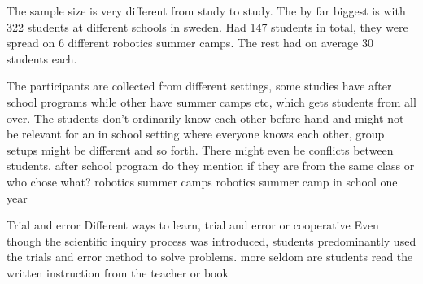 \bigskip\noindent
The sample size is very different from study to study. The by far biggest is \cite{lindh2007does} with 322 students at different schools in sweden. \cite{nugent2009use} Had 147 students in total, they were spread on 6 different robotics summer camps. The rest had on average 30 students each.

\bigskip\noindent
The participants are collected from different settings, some studies have after school programs while other have summer camps etc, which gets students from all over. The students don’t ordinarily know each other before hand and might not be relevant for an in school setting where everyone knows each other, group setups might be different and so forth. There might even be conflicts between students.
\cite{barker2007robotics} after school program do they mention if they are from the same class or who chose what?
\cite{nugent2009use} robotics summer camps
\cite{williams2007acquisition} robotics summer camp
\cite{lindh2007does} in school one year

\bigskip\noindent
Trial and error 
\cite{lindh2007does} Different ways to learn, trial and error or cooperative
\cite{williams2007acquisition} Even though the scientific inquiry process was introduced, students predominantly used the trials and error method to solve problems. 
\cite{lindh2007does}more seldom are students read the written instruction from the teacher or book

